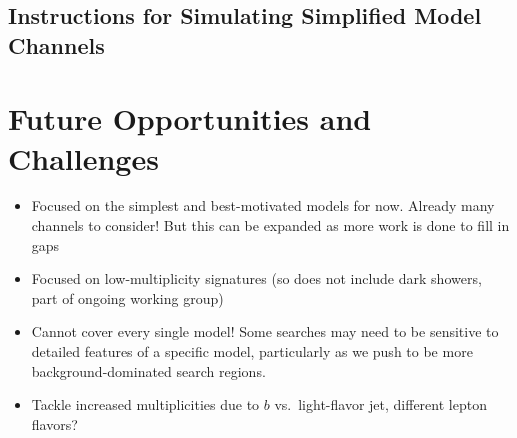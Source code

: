 \subsection{Instructions for Simulating Simplified Model Channels}


\section{Future Opportunities and Challenges}\label{sec:simplified_future}
\begin{itemize}
\item Focused on the simplest and best-motivated models for now. Already many channels to consider! But this can be expanded as more work is done to fill in gaps
\item Focused on low-multiplicity signatures (so does not include dark showers, part of ongoing working group)
\item Cannot cover every single model! Some searches may need to be sensitive to detailed features of a specific model, particularly as we push to be more background-dominated search regions.
\item Tackle increased multiplicities due to $b$ vs.~light-flavor jet, different lepton flavors?
\end{itemize}
